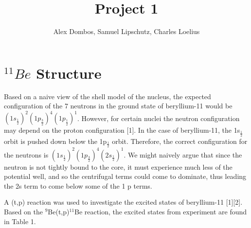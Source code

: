 \documentclass[11pt]{article} %
\title{Project 1}
\author{Alex Dombos, Samuel Lipschutz, Charles Loelius}
\begin{document}
\maketitle

\section{$^{11}Be$ Structure}


Based on a naive view of the shell model of the nucleus, the expected configuration of the 7 neutrons in the ground state of beryllium-11 would be $(1s_{\frac{1}{2}})^{2}(1p_{\frac{3}{2}})^{4}(1p_{\frac{1}{2}})^{1}$. However, for certain nuclei the neutron configuration may depend on the proton configuration [1]. In the case of beryllium-11, the 1s$_{\frac{1}{2}}$ orbit is pushed down below the 1p$_{\frac{1}{2}}$ orbit. Therefore, the correct configuration for the neutrons is $(1s_{\frac{1}{2}})^{2}(1p_{\frac{3}{2}})^{4}(2s_{\frac{1}{2}})^{1}$. We might naively argue that since the neutron is not tightly bound to the core, it must experience much less of the potential well, and so the centrifugal terms could come to dominate, thus leading the 2s term to come below some of the 1 p terms.


A (t,p) reaction was used to investigate the excited states of beryllium-11 [1][2]. Based on the $^{9}$Be(t,p)$^{11}$Be reaction, the excited states from experiment are found in Table 1.
\end{document}
